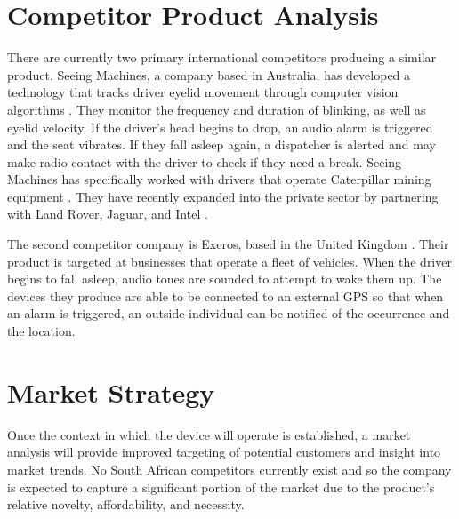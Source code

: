 \section{Competitor Product Analysis}
\label{sec:competitoranalysis}
There are currently two primary international competitors producing a similar product. Seeing Machines, a company based in Australia, has developed a technology that tracks driver eyelid movement through computer vision algorithms \cite{SeeingMachinesWebsite}. They monitor the frequency and duration of blinking, as well as eyelid velocity. If the driver's head begins to drop, an audio alarm is triggered and the seat vibrates. If they fall asleep again, a dispatcher is alerted and may make radio contact with the driver to check if they need a break. Seeing Machines has specifically worked with drivers that operate Caterpillar mining equipment \cite{SeeingMachinesWired}. They have recently expanded into the private sector by partnering with Land Rover, Jaguar, and Intel \cite{sm_similarities}.

\pagebreak
The second competitor company is Exeros, based in the United Kingdom \cite{Exeros}. Their product is targeted at businesses that operate a fleet of vehicles. When the driver begins to fall asleep, audio tones are sounded to attempt to wake them up. The devices they produce are able to be connected to an external GPS so that when an alarm is triggered, an outside individual can be notified of the occurrence and the location.

\section{Market Strategy}
Once the context in which the device will operate is established, a market analysis will provide improved targeting of potential customers and insight into market trends. No South African competitors currently exist and so the company is expected to capture a significant portion of the market due to the product’s relative novelty, affordability, and necessity.

